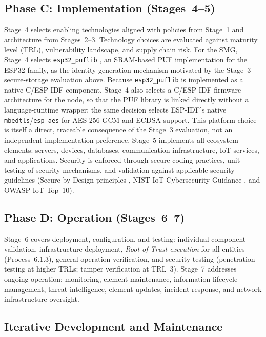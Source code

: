 \documentclass[preprint,12pt,authoryear]{elsarticle}
\begin{document}
\subsection{Phase C: Implementation (Stages~4--5)}

Stage~4 selects enabling technologies aligned with policies from Stage~1 and architecture from Stages~2--3. Technology choices are evaluated against maturity level (TRL), vulnerability landscape, and supply chain risk. For the SMG, Stage~4 selects \texttt{esp32\_puflib} \citep{stanicek2022esp32puflib}, an SRAM-based PUF implementation for the ESP32 family, as the identity-generation mechanism motivated by the Stage~3 secure-storage evaluation above. Because \texttt{esp32\_puflib} is implemented as a native C/ESP-IDF component, Stage~4 also selects a C/ESP-IDF firmware architecture for the node, so that the PUF library is linked directly without a language-runtime wrapper; the same decision selects ESP-IDF's native \texttt{mbedtls}/\texttt{esp\_aes} for AES-256-GCM and ECDSA support. This platform choice is itself a direct, traceable consequence of the Stage~3 evaluation, not an independent implementation preference. Stage~5 implements all ecosystem elements: servers, devices, databases, communication infrastructure, IoT services, and applications. Security is enforced through secure coding practices, unit testing of security mechanisms, and validation against applicable security guidelines (Secure-by-Design principles \citep{ukgov2024sbdprinciples}, NIST IoT Cybersecurity Guidance \citep{NIST_IoT_2020}, and OWASP IoT Top~10).

\subsection{Phase D: Operation (Stages~6--7)}

Stage~6 covers deployment, configuration, and testing: individual component validation, infrastructure deployment, \emph{Root of Trust execution} for all entities (Process~6.1.3), general operation verification, and security testing (penetration testing at higher TRLs; tamper verification at TRL~3). Stage~7 addresses ongoing operation: monitoring, element maintenance, information lifecycle management, threat intelligence, element updates, incident response, and network infrastructure oversight.

\subsection{Iterative Development and Maintenance}
\end{document}
